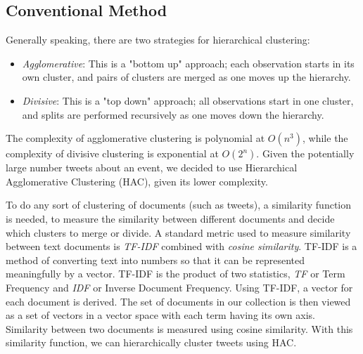 \documentclass[letterpaper]{article}
\begin{document}
\subsection{Conventional Method}
Generally speaking, there are two strategies for hierarchical clustering: %
\begin{itemize}
\item \emph{Agglomerative}: This is a "bottom up" approach; each observation starts in its own cluster, and pairs of clusters are merged as one moves up the hierarchy.
\item \emph{Divisive}: This is a "top down" approach; all observations start in one cluster, and splits are performed recursively as one moves down the hierarchy.
\end{itemize}

The complexity of agglomerative clustering is polynomial at $O(n^{3})$, while the complexity of divisive clustering is exponential at $O(2^{n})$. Given the potentially large number tweets about an event, we decided to use Hierarchical Agglomerative Clustering (HAC), given its lower complexity. 

To do any sort of clustering of documents (such as tweets), a similarity function is needed, to measure the similarity between different documents and decide which clusters to merge or divide. A standard metric used to measure similarity between text documents is \emph{TF-IDF} combined with \emph{cosine similarity}. TF-IDF is a method of converting text into numbers so that it can be represented meaningfully by a vector. TF-IDF is the product of two statistics, \emph{TF} or Term Frequency and \emph{IDF} or Inverse Document Frequency. 
Using TF-IDF, a vector for each document is derived. The set of documents in our collection is then viewed as a set of vectors in a vector space with each term  having its own axis. Similarity between two documents is measured using cosine similarity. With this similarity function, we can hierarchically cluster tweets using HAC. %
\end{document}
